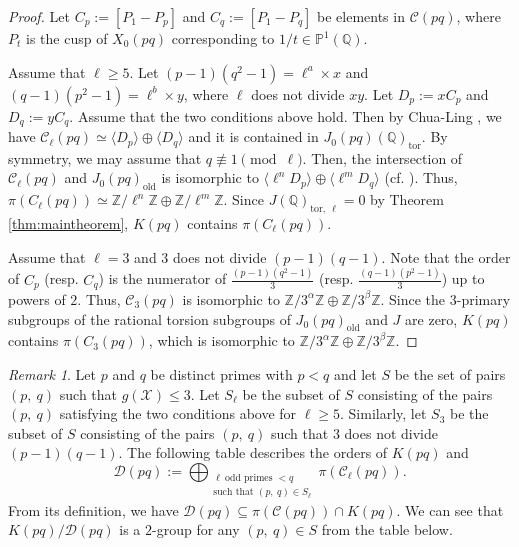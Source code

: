 \documentclass[a4paper, 12pt]{amsart}
\theoremstyle{definition}
\theoremstyle{remark}
\newtheorem{rem}[thm]{Remark}
\numberwithin{equation}{section} \numberwithin{table}{section}
\begin{document}
\begin{proof} 
Let $C_p:=[P_1-P_p]$ and $C_q:=[P_1-P_q]$ be elements in ${{\mathcal{C}}}(pq)$, where $P_t$ is the cusp of $X_0(pq)$ corresponding to $1/t \in {{\mathbb{P}}}^1({{\mathbb{Q}}})$. 

Assume that $\ell\geq 5$. 
Let $(p-1)(q^2-1)=\ell^a \times x$ and $(q-1)(p^2-1)=\ell^b \times y$, where $\ell$ does not divide $xy$. Let $D_p:=xC_p$ and $D_q:=yC_q$. Assume that the two conditions above hold. Then by Chua-Ling \cite[Lemma 1.(i)]{CL97}, we have ${{\mathcal{C}}}_{\ell}(pq) \simeq {\langle {D_p} \rangle} \oplus {\langle {D_q} \rangle}$ and it is contained in $J_0(pq)({{\mathbb{Q}}})_{{\mathrm{tor}}}$. By symmetry, we may assume that $q\not\equiv 1 {{ \!\pmod {\ell}}}$. Then, the intersection of ${{\mathcal{C}}}_{\ell}(pq)$ and $J_0(pq)_{{\mathrm{old}}}$ is isomorphic to ${\langle {\ell^n D_p} \rangle} \oplus {\langle {\ell^m D_q} \rangle}$ (cf. \cite[Theorem 2]{CL97}). Thus, $\pi(C_{\ell}(pq)) \simeq {{{{\mathbb{Z}}}/{{\ell^n}}{{\mathbb{Z}}}}} \oplus {{{{\mathbb{Z}}}/{{\ell^m}}{{\mathbb{Z}}}}}$. Since $J({{\mathbb{Q}}})_{{{\mathrm{tor}}}, ~\ell}=0$ by Theorem \ref{thm:maintheorem}, $K(pq)$ contains $\pi(C_{\ell}(pq))$.

Assume that $\ell=3$ and $3$ does not divide $(p-1)(q-1)$.
Note that the order of $C_p$ (resp. $C_q$) is the numerator of $\frac{(p-1)(q^2-1)}{3}$ (resp. $\frac{(q-1)(p^2-1)}{3}$) up to powers of $2$. Thus, ${{\mathcal{C}}}_3(pq)$ is isomorphic to ${{{{\mathbb{Z}}}/{{3^{\alpha}}}{{\mathbb{Z}}}}}\oplus {{{{\mathbb{Z}}}/{{3^{\beta}}}{{\mathbb{Z}}}}}$. Since the $3$-primary subgroups of the rational torsion subgroups of $J_0(pq)_{{\mathrm{old}}}$ and $J$ are zero, $K(pq)$ contains $\pi(C_3(pq))$, which is isomorphic to ${{{{\mathbb{Z}}}/{{3^{\alpha}}}{{\mathbb{Z}}}}}\oplus {{{{\mathbb{Z}}}/{{3^{\beta}}}{{\mathbb{Z}}}}}$.
\end{proof}

\begin{rem}
Let $p$ and $q$ be distinct primes with $p<q$ 
and let $S$ be the set of pairs $(p,~q)$ such that $g({{\mathcal{X}}}) \leq 3$.
Let $S_{\ell}$ be the subset of $S$ consisting of the pairs $(p,~q)$ satisfying the two conditions above for $\ell \geq 5$. Similarly, let $S_3$ be the subset of $S$ consisting of the pairs $(p,~q)$ such that $3$ does not divide $(p-1)(q-1)$. The following table describes the orders of $K(pq)$ and 
$$
{{\mathcal{D}}}(pq) := \bigoplus_{\substack{\ell~\text{odd primes } < q\\\text{such that }(p, ~q) \in S_{\ell}}} 
\pi({{\mathcal{C}}}_{\ell}(pq)).
$$
From its definition, we have ${{\mathcal{D}}}(pq) \subseteq \pi({{\mathcal{C}}}(pq)) \cap K(pq)$. We can see that $K(pq)/{{\mathcal{D}}}(pq)$ is a $2$-group for any $(p,~q) \in S$ from the table below.
\end{rem}
\end{document}
